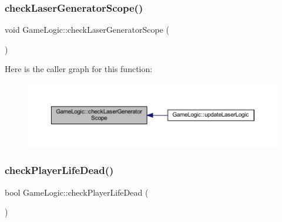 \mbox{\label{class_game_logic_ada1e9103a2d46866076c2d3b69c7eaff}} 
\subsubsection{\texorpdfstring{check\+Laser\+Generator\+Scope()}{checkLaserGeneratorScope()}}
{\footnotesize\ttfamily void Game\+Logic\+::check\+Laser\+Generator\+Scope (\begin{DoxyParamCaption}{ }\end{DoxyParamCaption})}

Here is the caller graph for this function\+:
\nopagebreak
\begin{figure}[H]
\begin{center}
\leavevmode
\includegraphics[width=350pt]{class_game_logic_ada1e9103a2d46866076c2d3b69c7eaff_icgraph}
\end{center}
\end{figure}
\mbox{\label{class_game_logic_a612e0df42ffe7ab590ce5a87c94aa6c9}} 
\subsubsection{\texorpdfstring{check\+Player\+Life\+Dead()}{checkPlayerLifeDead()}}
{\footnotesize\ttfamily bool Game\+Logic\+::check\+Player\+Life\+Dead (\begin{DoxyParamCaption}{ }\end{DoxyParamCaption})}

